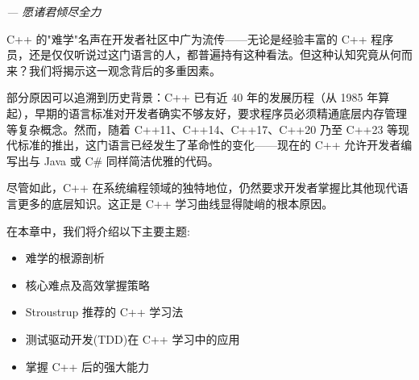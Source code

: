 \begin{flushright}
\textit{--- 愿诸君倾尽全力}
\end{flushright}

C++ 的"难学"名声在开发者社区中广为流传——无论是经验丰富的 C++ 程序员，还是仅仅听说过这门语言的人，都普遍持有这种看法。但这种认知究竟从何而来？我们将揭示这一观念背后的多重因素。

部分原因可以追溯到历史背景：C++ 已有近 40 年的发展历程（从 1985 年算起），早期的语言标准对开发者确实不够友好，要求程序员必须精通底层内存管理等复杂概念。然而，随着 C++11、C++14、C++17、C++20 乃至 C++23 等现代标准的推出，这门语言已经发生了革命性的变化——现在的 C++ 允许开发者编写出与 Java 或 C\# 同样简洁优雅的代码。

尽管如此，C++ 在系统编程领域的独特地位，仍然要求开发者掌握比其他现代语言更多的底层知识。这正是 C++ 学习曲线显得陡峭的根本原因。

在本章中，我们将介绍以下主要主题:

\begin{itemize}
\item 
难学的根源剖析

\item 
核心难点及高效掌握策略

\item 
Stroustrup 推荐的 C++ 学习法

\item 
测试驱动开发(TDD)在 C++ 学习中的应用

\item 
掌握 C++ 后的强大能力
\end{itemize}



